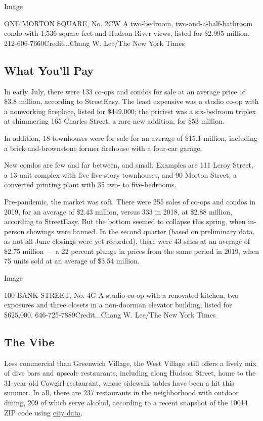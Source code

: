 Image

ONE MORTON SQUARE, No. 2CW \textbar{} A two-bedroom,
two-and-a-half-bathroom condo with 1,536 square feet and Hudson River
views, listed for \$2.995 million. 212-606-7660Credit...Chang W. Lee/The
New York Times

\hypertarget{what-youll-pay}{%
\subsection{What You'll Pay}\label{what-youll-pay}}

In early July, there were 133 co-ops and condos for sale at an average
price of \$3.8 million, according to StreetEasy. The least expensive was
a studio co-op with a nonworking fireplace, listed for \$449,000; the
priciest was a six-bedroom triplex at shimmering 165 Charles Street, a
rare new addition, for \$53 million.

In addition, 18 townhouses were for sale for an average of \$15.1
million, including a brick-and-brownstone former firehouse with a
four-car garage.

New condos are few and far between, and small. Examples are 111 Leroy
Street, a 13-unit complex with five five-story townhouses, and 90 Morton
Street, a converted printing plant with 35 two- to five-bedrooms.

Pre-pandemic, the market was soft. There were 255 sales of co-ops and
condos in 2019, for an average of \$2.43 million, versus 333 in 2018, at
\$2.88 million, according to StreetEasy. But the bottom seemed to
collapse this spring, when in-person showings were banned. In the second
quarter (based on preliminary data, as not all June closings were yet
recorded), there were 43 sales at an average of \$2.75 million --- a 22
percent plunge in prices from the same period in 2019, when 75 units
sold at an average of \$3.54 million.

Image

100 BANK STREET, No. 4G \textbar{} A studio co-op with a renovated
kitchen, two exposures and three closets in a non-doorman elevator
building, listed for \$625,000. 646-725-7889Credit...Chang W. Lee/The
New York Times

\hypertarget{the-vibe}{%
\subsection{The Vibe}\label{the-vibe}}

Less commercial than Greenwich Village, the West Village still offers a
lively mix of dive bars and upscale restaurants, including along Hudson
Street, home to the 31-year-old Cowgirl restaurant, whose sidewalk
tables have been a hit this summer. In all, there are 237 restaurants in
the neighborhood with outdoor dining, 209 of which serve alcohol,
according to a recent snapshot of the 10014 ZIP code using
\href{https://experience.arcgis.com/experience/ba953db7d541423a8e67ae1cf52bc698}{city
data}.

